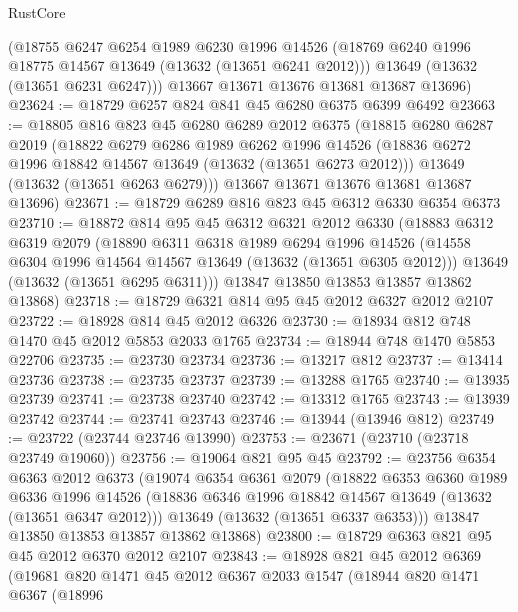 \begin{lexlean}{RustCore}
\begin{coremodule}
      (@18755
        @6247
        @6254
        @1989
        @6230
        @1996
        @14526
        (@18769 @6240 @1996 @18775 @14567 @13649 (@13632 (@13651 @6241 @2012)))
        @13649
        (@13632 (@13651 @6231 @6247)))
      @13667
      @13671
      @13676
      @13681
      @13687
      @13696)
@23624 := @18729 @6257 @824 @841 @45 @6280 @6375 @6399 @6492
@23663 := @18805
    @816
    @823
    @45
    @6280
    @6289
    @2012
    @6375
    (@18815
      @6280
      @6287
      @2019
      (@18822
        @6279
        @6286
        @1989
        @6262
        @1996
        @14526
        (@18836 @6272 @1996 @18842 @14567 @13649 (@13632 (@13651 @6273 @2012)))
        @13649
        (@13632 (@13651 @6263 @6279)))
      @13667
      @13671
      @13676
      @13681
      @13687
      @13696)
@23671 := @18729 @6289 @816 @823 @45 @6312 @6330 @6354 @6373
@23710 := @18872
    @814
    @95
    @45
    @6312
    @6321
    @2012
    @6330
    (@18883
      @6312
      @6319
      @2079
      (@18890
        @6311
        @6318
        @1989
        @6294
        @1996
        @14526
        (@14558 @6304 @1996 @14564 @14567 @13649 (@13632 (@13651 @6305 @2012)))
        @13649
        (@13632 (@13651 @6295 @6311)))
      @13847
      @13850
      @13853
      @13857
      @13862
      @13868)
@23718 := @18729 @6321 @814 @95 @45 @2012 @6327 @2012 @2107
@23722 := @18928 @814 @45 @2012 @6326
@23730 := @18934 @812 @748 @1470 @45 @2012 @5853 @2033 @1765
@23734 := @18944 @748 @1470 @5853 @22706
@23735 := @23730 @23734
@23736 := @13217 @812
@23737 := @13414 @23736
@23738 := @23735 @23737
@23739 := @13288 @1765
@23740 := @13935 @23739
@23741 := @23738 @23740
@23742 := @13312 @1765
@23743 := @13939 @23742
@23744 := @23741 @23743
@23746 := @13944 (@13946 @812)
@23749 := @23722 (@23744 @23746 @13990)
@23753 := @23671 (@23710 (@23718 @23749 @19060))
@23756 := @19064 @821 @95 @45
@23792 := @23756
    @6354
    @6363
    @2012
    @6373
    (@19074
      @6354
      @6361
      @2079
      (@18822
        @6353
        @6360
        @1989
        @6336
        @1996
        @14526
        (@18836 @6346 @1996 @18842 @14567 @13649 (@13632 (@13651 @6347 @2012)))
        @13649
        (@13632 (@13651 @6337 @6353)))
      @13847
      @13850
      @13853
      @13857
      @13862
      @13868)
@23800 := @18729 @6363 @821 @95 @45 @2012 @6370 @2012 @2107
@23843 := @18928
    @821
    @45
    @2012
    @6369
    (@19681
      @820
      @1471
      @45
      @2012
      @6367
      @2033
      @1547
      (@18944
        @820
        @1471
        @6367
        (@18996

\end{coremodule}
\end{lexlean}
